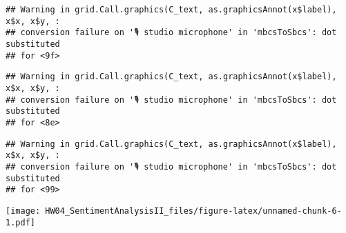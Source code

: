 \documentclass[
]{article}
\begin{document}
\begin{verbatim}
## Warning in grid.Call.graphics(C_text, as.graphicsAnnot(x$label), x$x, x$y, :
## conversion failure on '🎙 studio microphone' in 'mbcsToSbcs': dot substituted
## for <9f>
\end{verbatim}

\begin{verbatim}
## Warning in grid.Call.graphics(C_text, as.graphicsAnnot(x$label), x$x, x$y, :
## conversion failure on '🎙 studio microphone' in 'mbcsToSbcs': dot substituted
## for <8e>
\end{verbatim}

\begin{verbatim}
## Warning in grid.Call.graphics(C_text, as.graphicsAnnot(x$label), x$x, x$y, :
## conversion failure on '🎙 studio microphone' in 'mbcsToSbcs': dot substituted
## for <99>
\end{verbatim}

\texttt{[image: HW04\_SentimentAnalysisII\_files/figure-latex/unnamed-chunk-6-1.pdf]}
\end{document}
